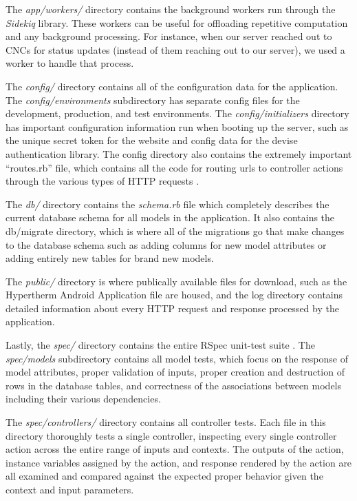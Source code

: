 \documentclass[12pt,letterpaper,titlepage]{article}
\begin{document}
The \textit{app/workers/} directory contains the background workers run through the \textit{Sidekiq} library. These workers can be useful for offloading repetitive computation and any background processing. For instance, when our server reached out to CNCs for status updates (instead of them reaching out to our server), we used a worker to handle that process.

The \textit{config/} directory contains all of the configuration data for the application. The \textit{config/environments} subdirectory has separate config files for the development, production, and test environments. The \textit{config/initializers} directory has important configuration information run when booting up the server, such as the unique secret token for the website and config data for the devise authentication library. The config directory also contains the extremely important ``routes.rb'' file, which contains all the code for routing urls to controller actions through the various types of HTTP requests \cite{rails routing guide}.

The \textit{db/} directory contains the \textit{schema.rb} file which completely describes the current database schema for all models in the application. It also contains the db/migrate directory, which is where all of the migrations go that make changes to the database schema such as adding columns for new model attributes or adding entirely new tables for brand new models.

The \textit{public/} directory is where publically available files for download, such as the Hypertherm Android Application file are housed, and the log directory contains detailed information about every HTTP request and response processed by the application.

Lastly, the \textit{spec/} directory contains the entire RSpec unit-test suite \cite{relish}. The \textit{spec/models} subdirectory contains all model tests, which focus on the response of model attributes, proper validation of inputs, proper creation and destruction of rows in the database tables, and correctness of the associations between models including their various dependencies.

The \textit{spec/controllers/} directory contains all controller tests. Each file in this directory thoroughly tests a single controller, inspecting every single controller action across the entire range of inputs and contexts. The outputs of the action, instance variables assigned by the action, and response rendered by the action are all examined and compared against the expected proper behavior given the context and input parameters.
\end{document}
